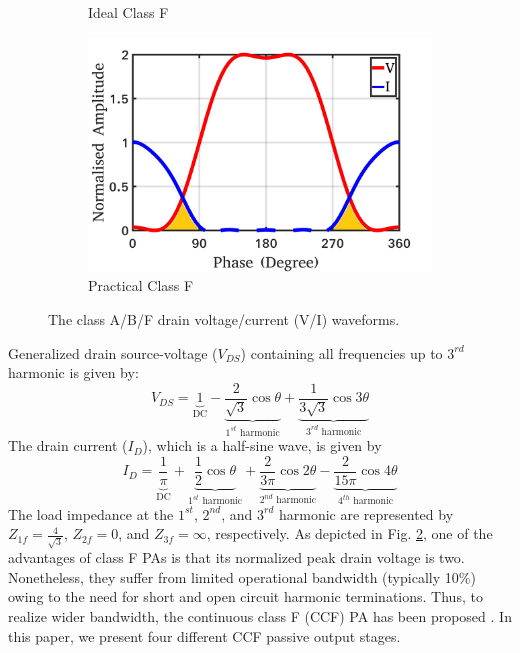 \documentclass[conference]{IEEEtran}
\begin{document}
\begin{figure}[!t]
\begin{subfigure}{0.24\textwidth}
\caption{Ideal Class F}
\label{fig:ICF_wave_VI}
\end{subfigure}
\begin{subfigure}{0.24\textwidth}
\includegraphics[width=1\textwidth]{Images/Intro/CF_wave_VI_shaded.pdf}
\caption{Practical Class F}
\label{fig:CF_wave_VI}
\end{subfigure}
\caption{The class A/B/F drain  voltage/current (V/I) waveforms. \color{black}}
\label{fig:wave_VI}
\vspace{-0.25in}
\end{figure}
Generalized drain source-voltage ($V_{DS}$) containing all frequencies up to $3^{rd}$ harmonic \cite{Gen_Vds_eqn} is given by:
\begin{equation}
V_{DS}=\underbrace{1}_{\text{DC}}-\underbrace{\frac{2}{\sqrt{3}} \cos \theta}_{\text{$1^{st}$ harmonic}}+\underbrace{\frac{1}{3 \sqrt{3}} \cos 3 \theta}_{\text{$3^{rd}$ harmonic}}
\label{eqn_CF_V}
\end{equation}
The drain current ($I_{D}$), which is a half-sine wave, is given by
\begin{equation}
I_{D}=\underbrace{\frac{1}{\pi}}_{\text{DC}}+\underbrace{\frac{1}{2} \cos \theta}_{\text{$1^{st}$ harmonic}}+\underbrace{\frac{2}{3 \pi} \cos 2 \theta}_{\text{$2^{nd}$ harmonic}}-\underbrace{\frac{2}{15 \pi} \cos 4 \theta}_{\text{$4^{th}$ harmonic}}
\label{eqn_CCF_I}
\end{equation}
The load impedance at the  $1^{st}$, $2^{nd}$, and $3^{rd}$ harmonic are represented by $Z_{1f}=\frac{4}{\sqrt{3}}$, $Z_{2f}=0$, and $Z_{3f}=\infty$, respectively. As depicted in Fig. \ref{fig:CF_wave_VI},  one of the advantages of class F PAs is that its normalized peak drain voltage is two. Nonetheless, they suffer from limited operational bandwidth (typically 10\%) owing to the need for short and open circuit harmonic terminations. Thus, to realize wider bandwidth, the continuous class F (CCF) PA has been proposed \cite{CCF_reason}. In this paper, we present four different CCF passive output stages. 
\end{document}

